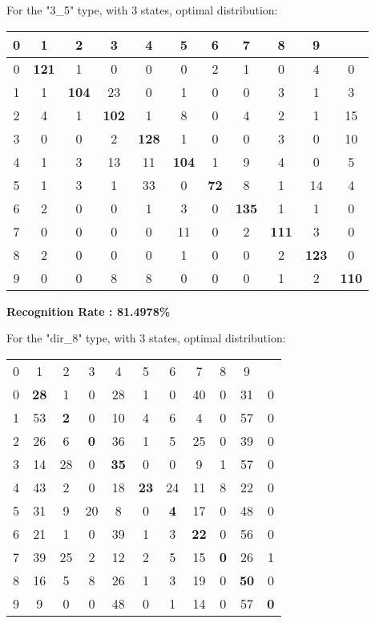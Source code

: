 \documentclass[a4paper]{article}
\begin{document}
For the "3\_5" type, with 3 states, optimal distribution:\newline

\begin{tabular}{ c | c | c | c | c | c | c | c | c | c | c }
  0 & 1 & 2 & 3 & 4 & 5 & 6 & 7 & 8 & 9 \\
  \hline
  0 & \textbf{121} & 1 &  0 &  0 &  0 &  2  & 1 & 0 & 4 & 0 \\
  \hline
  1 & 1 & \textbf{104} & 23 &  0 &  1 &  0 &  0  & 3 & 1 & 3 \\
  \hline
  2 & 4 & 1 & \textbf{102}  & 1  & 8 &  0  & 4  & 2 & 1 & 15 \\
  \hline
  3 & 0 & 0 &  2 & \textbf{128} &  1 &  0  & 0  & 3 & 0 & 10 \\
  \hline
  4 & 1 & 3 & 13 & 11 & \textbf{104} &  1 &  9  & 4 & 0 & 5 \\
  \hline
  5 & 1 & 3  & 1 & 33  & 0 & \textbf{72} &  8 &  1 & 14 & 4 \\
  \hline
  6 & 2 & 0 &  0  & 1 &  3 &  0 & \textbf{135} &   1 & 1 & 0 \\
  \hline
  7 & 0 & 0 &  0 &  0 & 11 &  0 &  2 & \textbf{111} & 3 & 0 \\
  \hline
  8 & 2 & 0 &  0 &  0 &  1 &  0 &  0 &  2 & \textbf{123} & 0 \\
  \hline
  9 & 0 & 0 &  8  & 8 &  0 &  0  & 0  & 1 & 2 & \textbf{110} \\
\end{tabular}

\hspace{20mm}
\linebreak

\textbf{Recognition Rate : 81.4978\%} \newline

For the "dir\_8" type, with 3 states, optimal distribution:\newline

\begin{tabular}{ c | c | c | c | c | c | c | c | c | c | c }
  0 & 1 & 2 & 3 & 4 & 5 & 6 & 7 & 8 & 9 \\
  0 & \textbf{28} &  1 &  0 &  28 &  1 &  0&  40 &  0&  31&  0 \\
  \hline
  1 & 53 &  \textbf{2} &  0 &  10 &  4 &  6&   4 &  0&  57&  0 \\
  \hline
  2 & 26 &  6 &  \textbf{0} &  36 &  1 &  5&  25 &  0&  39&  0 \\
  \hline
  3 & 14 & 28 &  0 &  \textbf{35} &  0 &  0&   9 &  1&  57&  0 \\
  \hline
  4 & 43 &  2 &  0 &  18 & \textbf{23} & 24&  11 &  8&  22&  0 \\
  \hline
  5 & 31 &  9 & 20 &   8 &  0 &  \textbf{4}&  17 &  0&  48&  0 \\
  \hline
  6 & 21 &  1 &  0 &  39 &  1 &  3&  \textbf{22} &  0&  56&  0 \\
  \hline
  7 & 39 & 25 &  2 &  12 &  2 &  5&  15 &  \textbf{0}&  26&  1 \\
  \hline
  8 & 16 &  5 &  8 &  26 &  1 &  3&  19 &  0&  \textbf{50}&  0 \\
  \hline
  9 & 9  & 0  & 0  & 48  & 0  & 1 & 14  & 0 & 57 &  \textbf{0} \\
\end{tabular}
\end{document}
